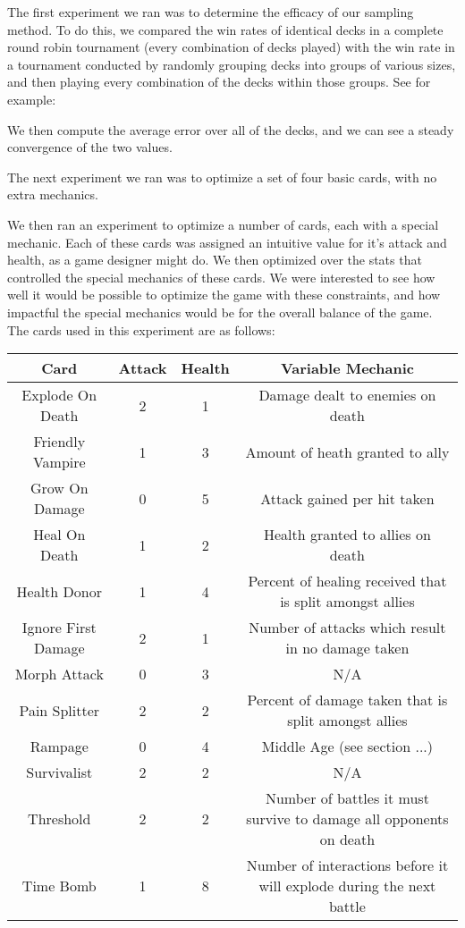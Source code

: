 The first experiment we ran was to determine the efficacy of our sampling method. To do this, we compared the win rates of identical decks in a complete round robin tournament (every combination of decks played) with the win rate in a tournament conducted by randomly grouping decks into groups of various sizes, and then playing every combination of the decks within those groups. See for example:


We then compute the average error over all of the decks, and we can see a steady convergence of the two values.


The next experiment we ran was to optimize a set of four basic cards, with no extra mechanics. 

We then ran an experiment to optimize a number of cards, each with a special mechanic. Each of these cards was assigned an intuitive value for it's attack and health, as a game designer might do. We then optimized over the stats that controlled the special mechanics of these cards. We were interested to see how well it would be possible to optimize the game with these constraints, and how impactful the special mechanics would be for the overall balance of the game. The cards used in this experiment are as follows:

\begin{tabular}{||c c c c||} 
 \hline
 Card & Attack & Health & Variable Mechanic \\ [0.5ex] 
 \hline\hline
 Explode On Death & 2 & 1 & Damage dealt to enemies on death \\ 
 \hline
 Friendly Vampire & 1 & 3 & Amount of heath granted to ally \\
 \hline
 Grow On Damage & 0 & 5 & Attack gained per hit taken \\
 \hline
 Heal On Death & 1 & 2 & Health granted to allies on death \\
 \hline
 Health Donor & 1 & 4 & Percent of healing received that is split amongst allies \\
 \hline
 Ignore First Damage & 2 & 1 & Number of attacks which result in no damage taken \\
 \hline
 Morph Attack & 0 & 3 & N/A \\
 \hline
 Pain Splitter & 2 & 2 & Percent of damage taken that is split amongst allies \\
 \hline
 Rampage & 0 & 4 & Middle Age (see section ...) \\
 \hline
 Survivalist & 2 & 2 & N/A \\
 \hline
 Threshold & 2 & 2 & Number of battles it must survive to damage all opponents on death \\
 \hline
 Time Bomb & 1 & 8 & Number of interactions before it will explode during the next battle \\ 
 \hline
\end{tabular}

